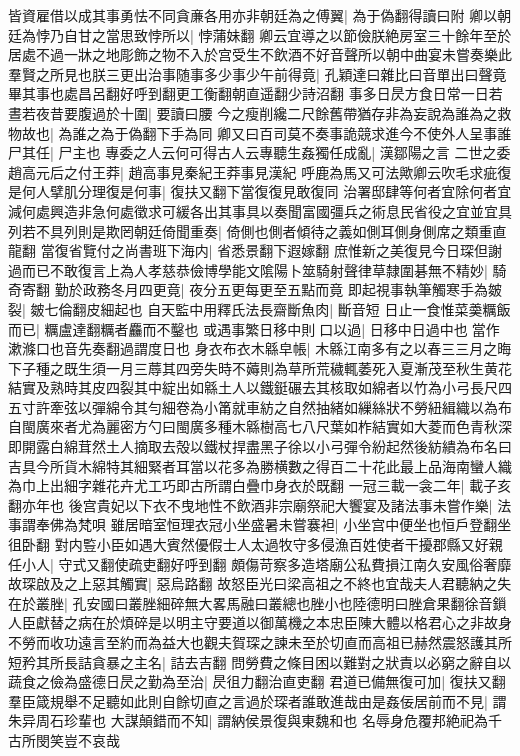 皆資雇借以成其事勇怯不同貪亷各用亦非朝廷為之傅翼|{
	為于偽翻得讀曰附}
卿以朝廷為悖乃自甘之當思致悖所以|{
	悖蒲妹翻}
卿云宜導之以節儉朕絶房室三十餘年至於居處不過一牀之地彫飾之物不入於宫受生不飲酒不好音聲所以朝中曲宴未嘗奏樂此羣賢之所見也朕三更出治事随事多少事少午前得竟|{
	孔穎達曰雜比曰音單出曰聲竟畢其事也處昌呂翻好呼到翻更工衡翻朝直遥翻少詩沼翻}
事多日昃方食日常一日若晝若夜昔要腹過於十圍|{
	要讀曰腰}
今之瘦削纔二尺餘舊帶猶存非為妄說為誰為之救物故也|{
	為誰之為于偽翻下手為同}
卿又曰百司莫不奏事詭競求進今不使外人呈事誰尸其任|{
	尸主也}
專委之人云何可得古人云專聽生姦獨任成亂|{
	漢鄒陽之言}
二世之委趙高元后之付王莽|{
	趙高事見秦紀王莽事見漢紀}
呼鹿為馬又可法歟卿云吹毛求疵復是何人擘肌分理復是何事|{
	復扶又翻下當復復見敢復同}
治署邸肆等何者宜除何者宜減何處興造非急何處徵求可緩各出其事具以奏聞富國彊兵之術息民省役之宜並宜具列若不具列則是欺罔朝廷倚聞重奏|{
	倚側也側者傾待之義如側耳側身側席之類重直龍翻}
當復省覽付之尚書班下海内|{
	省悉景翻下遐嫁翻}
庶惟新之美復見今日琛但謝過而已不敢復言上為人孝慈恭儉博學能文隂陽卜筮騎射聲律草隸圍碁無不精妙|{
	騎奇寄翻}
勤於政務冬月四更竟|{
	夜分五更每更至五點而竟}
即起視事執筆觸寒手為皴裂|{
	皴七倫翻皮細起也}
自天監中用釋氏法長齋斷魚肉|{
	斷音短}
日止一食惟菜羮糲飯而已|{
	糲盧達翻糲者麤而不鑿也}
或遇事繁日移中則口以過|{
	日移中日過中也當作漱滌口也音先奏翻過謂度日也}
身衣布衣木緜皁帳|{
	木緜江南多有之以春三三月之晦下子種之既生須一月三蓐其四旁失時不薅則為草所荒穢輒萎死入夏漸茂至秋生黄花結實及熟時其皮四裂其中綻出如緜土人以鐵鋌碾去其核取如綿者以竹為小弓長尺四五寸許牽弦以彈綿令其勻細卷為小筩就車紡之自然抽緒如繅絲狀不勞紐緝織以為布自閩廣來者尤為麗密方勺曰閩廣多種木緜樹高七八尺葉如柞結實如大菱而色青秋深即開露白綿茸然土人摘取去殻以鐵杖捍盡黑子徐以小弓彈令紛起然後紡繢為布名曰吉具今所貨木綿特其細緊者耳當以花多為勝横數之得百二十花此最上品海南蠻人織為巾上出細字雜花卉尤工巧即古所謂白疊巾身衣於既翻}
一冠三載一衾二年|{
	載子亥翻亦年也}
後宫貴妃以下衣不曳地性不飲酒非宗廟祭祀大饗宴及諸法事未嘗作樂|{
	法事謂奉佛為梵唄}
雖居暗室恒理衣冠小坐盛暑未嘗褰袒|{
	小坐宫中便坐也恒戶登翻坐徂卧翻}
對内䜿小臣如遇大賓然優假士人太過牧守多侵漁百姓使者干擾郡縣又好親任小人|{
	守式又翻使疏吏翻好呼到翻}
頗傷苛察多造塔廟公私費損江南久安風俗奢靡故琛啟及之上惡其觸實|{
	惡烏路翻}
故怒臣光曰梁高祖之不終也宜哉夫人君聽納之失在於叢脞|{
	孔安國曰叢脞細碎無大畧馬融曰叢總也脞小也陸德明曰脞倉果翻徐音鎻}
人臣獻替之病在於煩碎是以明主守要道以御萬機之本忠臣陳大體以格君心之非故身不勞而收功遠言至約而為益大也觀夫賀琛之諫未至於切直而高祖已赫然震怒護其所短矜其所長詰貪暴之主名|{
	詰去吉翻}
問勞費之條目困以難對之狀責以必窮之辭自以蔬食之儉為盛德日昃之勤為至治|{
	昃徂力翻治直吏翻}
君道已備無復可加|{
	復扶又翻}
羣臣箴規舉不足聽如此則自餘切直之言過於琛者誰敢進哉由是姦佞居前而不見|{
	謂朱异周石珍輩也}
大謀顛錯而不知|{
	謂納侯景復與東魏和也}
名辱身危覆邦絶祀為千古所閔笑豈不哀哉

